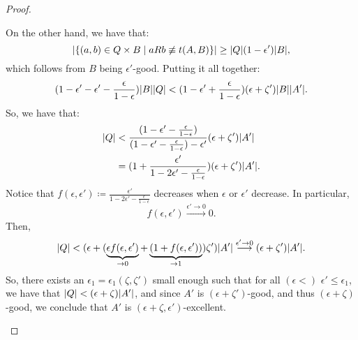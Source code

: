 \begin{lemma}
\begin{proof}
\begin{enumerate}[label={\Roman*}., ref={\Roman*}, font=\rmfamily]
                    On the other hand, we have that:
                    \[
                        | \{ (a,b) \in Q \times B \mid aRb \not\equiv t(A, B) \} | \geq
                        | Q | ( 1 - \epsilon' ) | B |,
                    \]
                    which follows from $B$ being $\epsilon'$-good.
                    Putting it all together:
                    \[
                        ( 1 - \epsilon' - \epsilon' - \frac{\epsilon}{1 - \epsilon} ) | B | | Q | <
                        ( 1 - \epsilon' + \frac{\epsilon}{1 - \epsilon} ) ( \epsilon + \zeta' ) | B | | A' |.
                    \]
                    So, we have that:
                    \begin{align*}
                        | Q | & < \frac{( 1 - \epsilon' - \frac{\epsilon}{1 - \epsilon} )}
                                            {( 1 - \epsilon' - \frac{\epsilon}{1 - \epsilon} ) - \epsilon'}
                                            ( \epsilon + \zeta' ) | A' | \\
                                        & = ( 1 + \frac{\epsilon'}{1 - 2\epsilon' - \frac{\epsilon}{1 - \epsilon}} )
                                            (\epsilon + \zeta') |A'|.
                    \end{align*}
                    Notice that $f(\epsilon, \epsilon') \coloneqq \frac{\epsilon'}{1 - 2\epsilon' - \frac{\epsilon}{1 - \epsilon}}$
                    decreases when $\epsilon$ or $\epsilon'$ decrease.
                    In particular,
                    \[
                        f(\epsilon, \epsilon') \overset{\epsilon' \to 0}{\longrightarrow} 0.
                    \]
                    Then,
                    \[
                        | Q | < ( \epsilon + ( \underbrace{\epsilon f(\epsilon, \epsilon')}_{\to 0} +
                        \underbrace{( 1 + f(\epsilon, \epsilon') )}_{\to 1} ) \zeta' ) |A'|
                        \overset{\epsilon' \to 0}{\longrightarrow} ( \epsilon + \zeta' ) |A'|.
                    \]
                    So, there exists an $\epsilon_1 = \epsilon_1(\zeta, \zeta')$ small enough such that for all
                    $(\epsilon <)$ $\epsilon' \leq \epsilon_1$, we have that $| Q | < ( \epsilon + \zeta ) |A'|$,
                    and since $A'$ is $(\epsilon + \zeta')$-good, and thus $(\epsilon + \zeta)$-good, we conclude that
                    $A'$ is $(\epsilon + \zeta, \epsilon')$-excellent.

\end{enumerate}
\end{proof}
\end{lemma}
